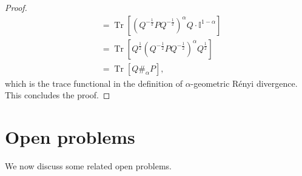 \documentclass[12pt]{article}
\theoremstyle{definition}
\begin{document}
\begin{proof}
\begin{equation}
\begin{aligned}
        &= \operatorname{Tr} \left[ \left( Q^{-\frac 12} P Q^{-\frac 12} \right)^\alpha Q   \cdot \mathbb I^{1-\alpha}  \right] \\
        &= \operatorname{Tr} \left[ Q ^{\frac12}  \left( Q^{-\frac 12} P Q^{-\frac 12} \right)^\alpha Q ^{\frac12}  \right] \\
&= \operatorname{Tr}\left[Q \#_\alpha P \right], 
    \end{aligned}
    \end{equation}
which is the trace functional in the definition of $\alpha$-geometric R\'enyi divergence. This concludes the proof.
\end{proof}





\section{Open problems } \label{Sec:OpenProb}

We now discuss some related open problems. 
\end{document}
